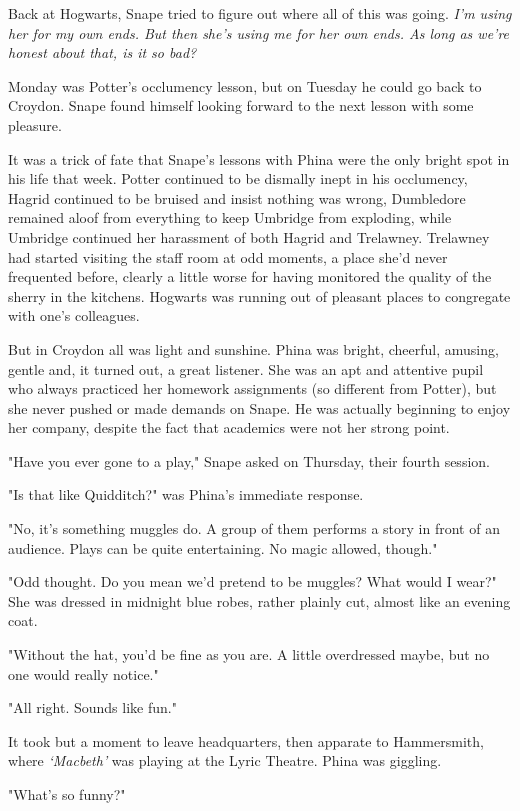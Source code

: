 Back at Hogwarts, Snape tried to figure out where all of this was going. \emph{I'm using her for my own ends. But then she's using me for her own ends. As long as we're honest about that, is it so bad?}

Monday was Potter's occlumency lesson, but on Tuesday he could go back to Croydon. Snape found himself looking forward to the next lesson with some pleasure.

It was a trick of fate that Snape's lessons with Phina were the only bright spot in his life that week. Potter continued to be dismally inept in his occlumency, Hagrid continued to be bruised and insist nothing was wrong, Dumbledore remained aloof from everything to keep Umbridge from exploding, while Umbridge continued her harassment of both Hagrid and Trelawney. Trelawney had started visiting the staff room at odd moments, a place she'd never frequented before, clearly a little worse for having monitored the quality of the sherry in the kitchens. Hogwarts was running out of pleasant places to congregate with one's colleagues.

But in Croydon all was light and sunshine. Phina was bright, cheerful, amusing, gentle and, it turned out, a great listener. She was an apt and attentive pupil who always practiced her homework assignments (so different from Potter), but she never pushed or made demands on Snape. He was actually beginning to enjoy her company, despite the fact that academics were not her strong point.

"Have you ever gone to a play," Snape asked on Thursday, their fourth session.

"Is that like Quidditch?" was Phina's immediate response.

"No, it's something muggles do. A group of them performs a story in front of an audience. Plays can be quite entertaining. No magic allowed, though."

"Odd thought. Do you mean we'd pretend to be muggles? What would I wear?" She was dressed in midnight blue robes, rather plainly cut, almost like an evening coat.

"Without the hat, you'd be fine as you are. A little overdressed maybe, but no one would really notice."

"All right. Sounds like fun."

It took but a moment to leave headquarters, then apparate to Hammersmith, where \emph{`Macbeth'} was playing at the Lyric Theatre. Phina was giggling.

"What's so funny?"

